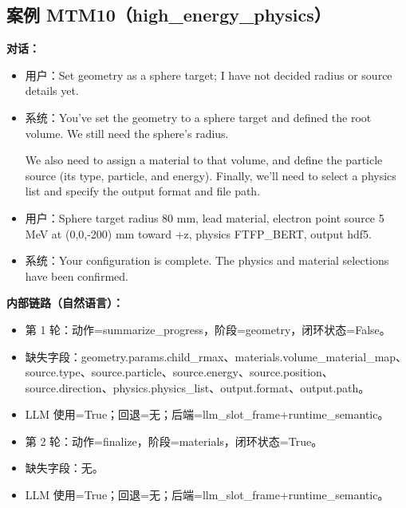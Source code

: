 \documentclass[11pt]{ctexart}
\begin{document}
\subsection{案例 MTM10（high\_energy\_physics）}
\textbf{对话：}
\begin{itemize}
\item 用户：Set geometry as a sphere target; I have not decided radius or source details yet.
\item 系统：You've set the geometry to a sphere target and defined the root volume. We still need the sphere's radius.

We also need to assign a material to that volume, and define the particle source (its type, particle, and energy). Finally, we'll need to select a physics list and specify the output format and file path.
\item 用户：Sphere target radius 80 mm, lead material, electron point source 5 MeV at (0,0,-200) mm toward +z, physics FTFP\_BERT, output hdf5.
\item 系统：Your configuration is complete. The physics and material selections have been confirmed.
\end{itemize}
\textbf{内部链路（自然语言）：}
\begin{itemize}
\item 第 1 轮：动作=summarize\_progress，阶段=geometry，闭环状态=False。
\item 缺失字段：geometry.params.child\_rmax、materials.volume\_material\_map、source.type、source.particle、source.energy、source.position、source.direction、physics.physics\_list、output.format、output.path。
\item LLM 使用=True；回退=无；后端=llm\_slot\_frame+runtime\_semantic。
\item 第 2 轮：动作=finalize，阶段=materials，闭环状态=True。
\item 缺失字段：无。
\item LLM 使用=True；回退=无；后端=llm\_slot\_frame+runtime\_semantic。
\end{itemize}
\end{document}
